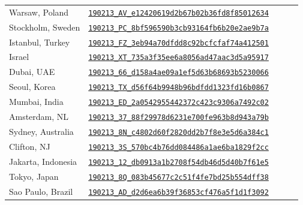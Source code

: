 \documentclass[a4paper, 12pt]{article}
\begin{document}
\begin{table}[H]
\begin{tabular}{*5l}
    Warsaw, Poland          & \href{https://www.webpagetest.org/result/190213_AV_e12420619d2b67b02b36fd8f85012634}{\texttt{190213\_AV\_e12420619d2b67b02b36fd8f85012634}} \\
    Stockholm, Sweden       & \href{https://www.webpagetest.org/result/190213_PC_8bf596590b3cb93164fb6b20e2ae9b7a}{\texttt{190213\_PC\_8bf596590b3cb93164fb6b20e2ae9b7a}} \\
    Istanbul, Turkey        & \href{https://www.webpagetest.org/result/190213_FZ_3eb94a70dfdd8c92bcfcfaf74a412501}{\texttt{190213\_FZ\_3eb94a70dfdd8c92bcfcfaf74a412501}} \\
    Israel                  & \href{https://www.webpagetest.org/result/190213_XT_735a3f35ee6a8056ad47aac3d5a95917}{\texttt{190213\_XT\_735a3f35ee6a8056ad47aac3d5a95917}} \\
    Dubai, UAE              & \href{https://www.webpagetest.org/result/190213_66_d158a4ae09a1ef5d63b68693b5230066}{\texttt{190213\_66\_d158a4ae09a1ef5d63b68693b5230066}} \\
    Seoul, Korea            & \href{https://www.webpagetest.org/result/190213_TX_d56f64b9948b96bdfdd1323fd16b0867}{\texttt{190213\_TX\_d56f64b9948b96bdfdd1323fd16b0867}} \\
    Mumbai, India           & \href{https://www.webpagetest.org/result/190213_ED_2a0542955442372c423c9306a7492c02}{\texttt{190213\_ED\_2a0542955442372c423c9306a7492c02}} \\
    Amsterdam, NL           & \href{https://www.webpagetest.org/result/190213_37_88f29978d6231e700fe963b8d943a79b}{\texttt{190213\_37\_88f29978d6231e700fe963b8d943a79b}} \\
    Sydney, Australia       & \href{https://www.webpagetest.org/result/190213_8N_c4802d60f2820dd2b7f8e3e5d6a384c1}{\texttt{190213\_8N\_c4802d60f2820dd2b7f8e3e5d6a384c1}} \\
    Clifton, NJ             & \href{https://www.webpagetest.org/result/190213_3S_570bc4b76dd084486a1ae6ba1829f2cc}{\texttt{190213\_3S\_570bc4b76dd084486a1ae6ba1829f2cc}} \\
    Jakarta, Indonesia      & \href{https://www.webpagetest.org/result/190213_12_db0913a1b2708f54db46d5d40b7f61e5}{\texttt{190213\_12\_db0913a1b2708f54db46d5d40b7f61e5}} \\
    Tokyo, Japan            & \href{https://www.webpagetest.org/result/190213_8Q_083b45677c2c51f4fe7bd25b554dff38}{\texttt{190213\_8Q\_083b45677c2c51f4fe7bd25b554dff38}} \\
    Sao Paulo, Brazil       & \href{https://www.webpagetest.org/result/190213_AD_d2d6ea6b39f36853cf476a5f1d1f3092}{\texttt{190213\_AD\_d2d6ea6b39f36853cf476a5f1d1f3092}} \\

\end{tabular}
\end{table}
\end{document}
